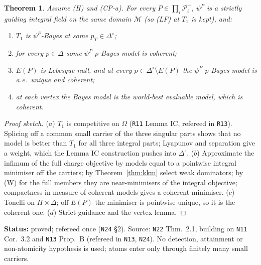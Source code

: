 \documentclass[11pt]{article}
\newtheorem{theorem}{Theorem}[section]
\theoremstyle{definition}
\theoremstyle{remark}
\newcommand{\Di}{\Delta^{\circ}}
\newcommand{\M}{\mathcal M}
\newcommand{\src}[1]{\texttt{#1}}
\newcommand{\status}[1]{\par\smallskip\noindent\textbf{Status:} #1\par\smallskip}
\begin{document}
\begin{theorem}\label{thm:integral}
Assume (H) and (CP-a). For every $P\in\prod_i\mathcal P^+_i$, $\psi^P$ is a strictly guiding integral field on the same domain $\M$ (so (LF) at $T_1$ is kept), and:
\begin{enumerate}[leftmargin=*,label=($\alph*$)]
\item $T_1$ is $\psi^P$-Bayes at some $p_T\in\Di$;
\item for every $p\in\Delta$ some $\psi^P$-$p$-Bayes model is coherent;
\item $E(P)$ is Lebesgue-null, and at every $p\in\Di\setminus E(P)$ the $\psi^P$-$p$-Bayes model is a.e.\ unique and coherent;
\item at each vertex the Bayes model is the world-best evaluable model, which is coherent.
\end{enumerate}
\end{theorem}
\begin{proof}[Proof sketch]
($a$) $T_1$ is competitive on $\Omega$ (\src{R11} Lemma IC, refereed in \src{R13}). Splicing off a common small carrier of the three singular parts shows that no model is better than $T_1$ for all three integral parts; Lyapunov and separation give a weight, which the Lemma IC construction pushes into $\Di$. ($b$) Approximate the infimum of the full charge objective by models equal to a pointwise integral minimiser off the carriers; by Theorem~\ref{thm:kkm} select weak dominators; by (W) for the full members they are near-minimisers of the integral objective; compactness in measure of coherent models gives a coherent minimiser. ($c$) Tonelli on $H\times\Delta$; off $E(P)$ the minimiser is pointwise unique, so it is the coherent one. ($d$) Strict guidance and the vertex lemma.
\end{proof}
\status{proved; refereed once (\src{N24} \S2). Source: \src{N22} Thm.~2.1, building on \src{N11} Cor.~3.2 and \src{N13} Prop.~B (refereed in \src{N13}, \src{N24}). No detection, attainment or non-atomicity hypothesis is used; atoms enter only through finitely many small carriers.}
\end{document}
